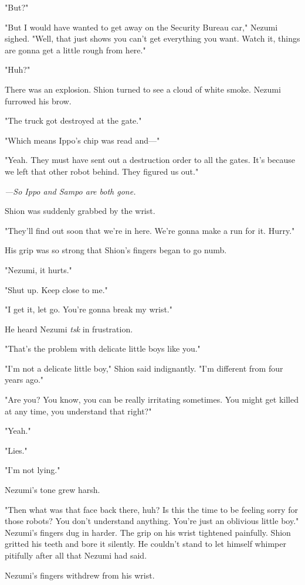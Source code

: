 "But?"

"But I would have wanted to get away on the Security Bureau car," Nezumi
sighed. "Well, that just shows you can't get everything you want. Watch
it, things are gonna get a little rough from here."

"Huh?"

There was an explosion. Shion turned to see a cloud of white smoke.
Nezumi furrowed his brow.

"The truck got destroyed at the gate."

"Which means Ippo's chip was read and---"

"Yeah. They must have sent out a destruction order to all the gates.
It's because we left that other robot behind. They figured us out."

\emph{---So Ippo and Sampo are both gone.}

Shion was suddenly grabbed by the wrist.

"They'll find out soon that we're in here. We're gonna make a run for
it. Hurry."

His grip was so strong that Shion's fingers began to go numb.

"Nezumi, it hurts."

"Shut up. Keep close to me."

"I get it, let go. You're gonna break my wrist."

He heard Nezumi \emph{tsk} in frustration.

"That's the problem with delicate little boys like you."

"I'm not a delicate little boy," Shion said indignantly. "I'm different
from four years ago."

"Are you? You know, you can be really irritating sometimes. You might
get killed at any time, you understand that right?"

"Yeah."

"Lies."

"I'm not lying."

Nezumi's tone grew harsh.

"Then what was that face back there, huh? Is this the time to be feeling
sorry for those robots? You don't understand anything. You're just an
oblivious little boy." Nezumi's fingers dug in harder. The grip on his
wrist tightened painfully. Shion gritted his teeth and bore it silently.
He couldn't stand to let himself whimper pitifully after all that Nezumi
had said.

Nezumi's fingers withdrew from his wrist.

